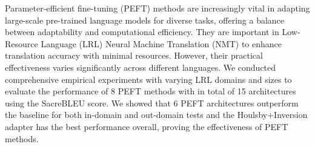 Parameter-efficient fine-tuning (PEFT) methods are increasingly vital in adapting large-scale pre-trained language models for diverse tasks, offering a balance between adaptability and computational efficiency. They are important in Low-Resource Language (LRL) Neural Machine Translation (NMT) to enhance translation accuracy with minimal resources. However, their practical effectiveness varies significantly across different languages. We conducted comprehensive empirical experiments with varying LRL domains and sizes to evaluate the performance of 8 PEFT methods with in total of 15 architectures using the SacreBLEU score. We showed that 6 PEFT architectures outperform the baseline for both in-domain and out-domain tests and the Houlsby+Inversion adapter has the best performance overall, proving the effectiveness of PEFT methods.